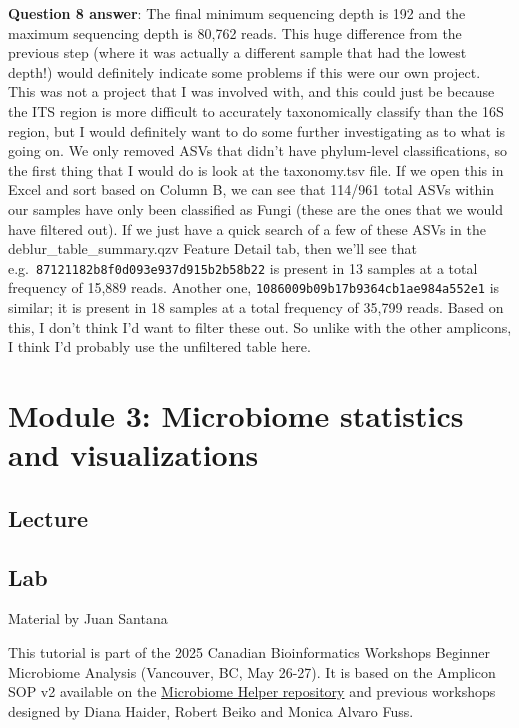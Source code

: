 \documentclass[
]{book}
\begin{document}
\textbf{Question 8 answer}: The final minimum sequencing depth is 192 and the maximum sequencing depth is 80,762 reads. This huge difference from the previous step (where it was actually a different sample that had the lowest depth!) would definitely indicate some problems if this were our own project. This was not a project that I was involved with, and this could just be because the ITS region is more difficult to accurately taxonomically classify than the 16S region, but I would definitely want to do some further investigating as to what is going on. We only removed ASVs that didn't have phylum-level classifications, so the first thing that I would do is look at the taxonomy.tsv file. If we open this in Excel and sort based on Column B, we can see that 114/961 total ASVs within our samples have only been classified as Fungi (these are the ones that we would have filtered out). If we just have a quick search of a few of these ASVs in the deblur\_table\_summary.qzv Feature Detail tab, then we'll see that e.g.~\texttt{87121182b8f0d093e937d915b2b58b22} is present in 13 samples at a total frequency of 15,889 reads. Another one, \texttt{1086009b09b17b9364cb1ae984a552e1} is similar; it is present in 18 samples at a total frequency of 35,799 reads. Based on this, I don't think I'd want to filter these out. So unlike with the other amplicons, I think I'd probably use the unfiltered table here.

\chapter{Module 3: Microbiome statistics and visualizations}\label{module-3-microbiome-statistics-and-visualizations}

\section{Lecture}\label{lecture-2}

\section{Lab}\label{lab}

Material by Juan Santana

This tutorial is part of the 2025 Canadian Bioinformatics Workshops Beginner Microbiome Analysis (Vancouver, BC, May 26-27). It is based on the Amplicon SOP v2 available on the \href{https://github.com/LangilleLab/microbiome_helper/wiki/Amplicon-SOP-v2-(qiime2-2022.11)}{Microbiome Helper repository} and previous workshops designed by Diana Haider, Robert Beiko and Monica Alvaro Fuss.
\end{document}

